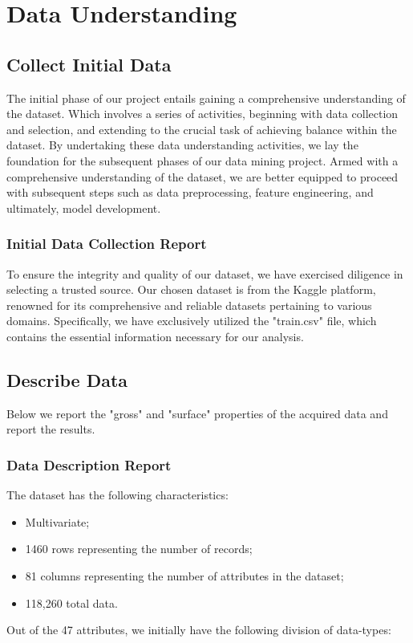 \chapter{Data Understanding}

\section{Collect Initial Data}

The initial phase of our project entails gaining a comprehensive understanding of the dataset. Which involves a series of activities, beginning with data collection and selection, and extending to the crucial task of achieving balance within the dataset. By undertaking these data understanding activities, we lay the foundation for the subsequent phases of our data mining project. Armed with a comprehensive understanding of the dataset, we are better equipped to proceed with subsequent steps such as data preprocessing, feature engineering, and ultimately, model development.

\subsection{Initial Data Collection Report}

To ensure the integrity and quality of our dataset, we have exercised diligence in selecting a trusted source. Our chosen dataset is from the Kaggle platform, renowned for its comprehensive and reliable datasets pertaining to various domains. Specifically, we have exclusively utilized the "train.csv" file, which contains the essential information necessary for our analysis.

\section{Describe Data}

Below we report the "gross" and "surface" properties of the acquired data and report the results.

\subsection{Data Description Report}

The dataset has the following characteristics: 
\begin{itemize}
    \item Multivariate;
    \item 1460 rows representing the number of records;
    \item 81 columns representing the number of attributes in the dataset;
    \item 118,260  total data.
\end{itemize}
Out of the 47 attributes, we initially have the following division of data-types: 

